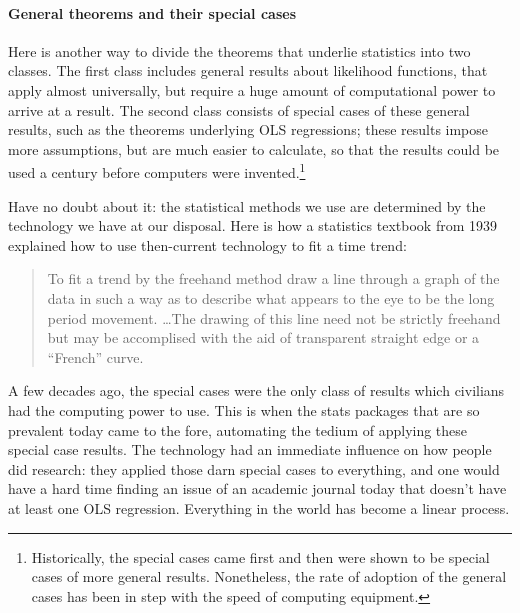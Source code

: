 \paragraph{General theorems and their special cases}
Here is another way to divide the theorems that underlie
statistics into two classes. The first class includes general
results about likelihood functions, that 
apply almost universally, but require a huge
amount of computational power to arrive at a result. The second class
consists of special cases of these general results, such as the theorems
underlying OLS regressions; these results impose more
assumptions, but are much easier to calculate, so that the results could
be used a century before computers were invented.\footnote{Historically,
the special cases came first and then were shown to be special cases of
more general results. Nonetheless, the rate of adoption of the general
cases has been in step with the speed of computing equipment.}


Have no doubt about it: the statistical methods we use are determined by
the technology we have at our disposal. Here is how a statistics textbook from 1939
\citep[p 43]{arkin:colton} explained how to use then-current technology to fit
a time trend:
\begin{quote}
To fit a trend by the freehand method draw a line through a graph of
the data in such a way as to describe what
appears to the eye to be the long period movement. \dots The drawing of
this line need not be strictly freehand but
may be accomplised with the aid of transparent straight edge or a
``French'' curve.
\end{quote}

A few decades ago, the special cases were the only class of results which
civilians had the computing power to use. This is when the stats packages
that are so prevalent today came to the fore, automating the tedium of
applying these special case results. The technology had an immediate
influence on how people did research: they applied those darn special
cases to everything, and one would have a hard time finding an issue of an
academic journal today that doesn't have at least one OLS regression.
Everything in the world has become a linear process.



